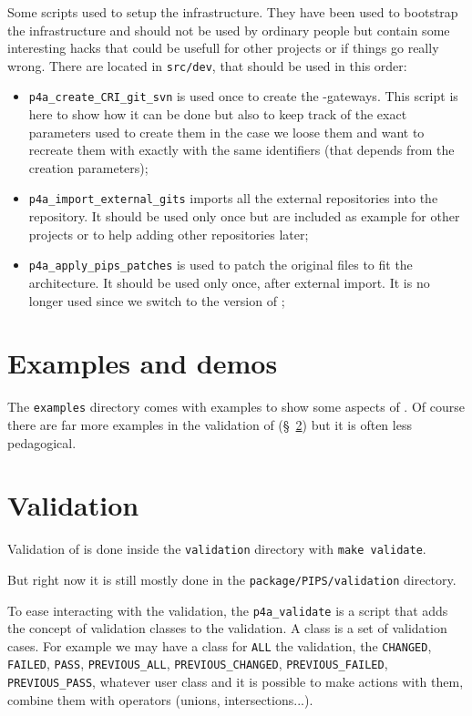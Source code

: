 \documentclass[a4paper]{article}
\begin{document}
Some scripts used to setup the infrastructure. They have been used to
bootstrap the \Apfa infrastructure and should not be used by ordinary
people but contain some interesting hacks that could be usefull for other
projects or if things go really wrong. There are located in
\texttt{src/dev}, that should be used in this order:
\begin{itemize}
\item \verb/p4a_create_CRI_git_svn/ is used once to create the \Apips
  \Asvn-\Agit gateways. This script is here to show how it can be done but
  also to keep track of the exact parameters used to create them in the
  case we loose them and want to recreate them with exactly with the same
  identifiers (that depends from the creation parameters);
\item \verb/p4a_import_external_gits/ imports all the external \Agit
  repositories into the \Apfa{} \Agit repository. It should be used only
  once but are included as example for other projects or to help adding
  other repositories later;
\item \verb/p4a_apply_pips_patches/ is used to patch the original \Apips
  files to fit the \Apfa architecture. It should be used only once, after
  external \Agit import. It is no longer used since we switch to the
  \Aautotools version of \Apips;
\end{itemize}


\section{Examples and demos}
\label{sec:examples-demos}

The \texttt{examples} directory comes with examples to show some aspects
of \Apfa. Of course there are far more examples in the validation of \Apfa
(\S~\ref{sec:validation}) but it is often less pedagogical.


\section{Validation}
\label{sec:validation}


Validation of \Apfa is done inside the \texttt{validation} directory with
\texttt{make validate}.

But right now it is still mostly done in the
\texttt{package/PIPS/validation} directory.

To ease interacting with the validation, the \verb|p4a_validate| is a
script that adds the concept of validation classes to the \Apips
validation. A class is a set of validation cases. For example we may have
a class for \texttt{ALL} the validation, the \texttt{CHANGED},
\texttt{FAILED}, \texttt{PASS}, \verb|PREVIOUS_ALL|,
\verb|PREVIOUS_CHANGED|, \verb|PREVIOUS_FAILED|, \verb|PREVIOUS_PASS|,
whatever user class and it is possible to make actions with them, combine
them with operators (unions, intersections...).
\end{document}
